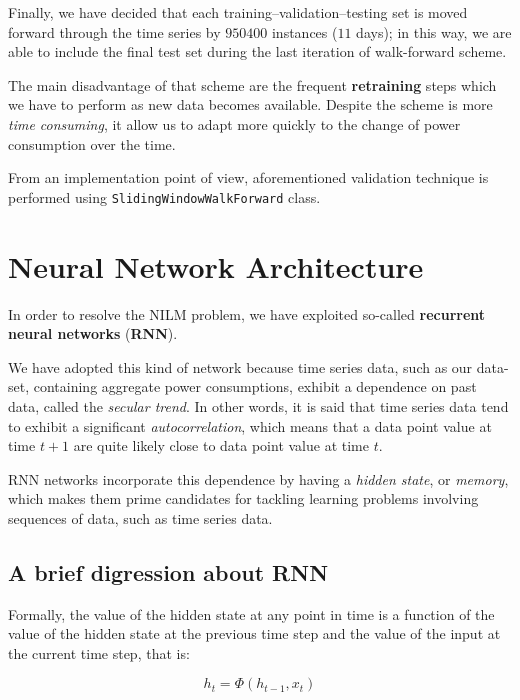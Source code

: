 \documentclass[sigconf]{acmart}
\begin{document}
Finally, we have decided that each training–validation–testing set is moved forward through the time series by $950400$ instances ($11$ days); in this way, we are able to include the final test set during the last iteration of walk-forward scheme.

The main disadvantage of that scheme are the frequent \textbf{retraining} steps which we have to perform as new data becomes available. Despite the scheme is more \textit{time consuming}, it allow us to adapt more quickly to the change of power consumption over the time\cite{WALK1}\cite{WALK2}.

From an implementation point of view, aforementioned validation technique is performed using \texttt{Sliding\-Window\-Walk\-Forward} class.

\section{Neural Network Architecture}

In order to resolve the NILM problem, we have exploited so-called \textbf{recurrent neural networks} (\textbf{RNN}).

We have adopted this kind of network because time series data, such as our data-set, containing aggregate power consumptions, exhibit a dependence on past data, called the \textit{secular trend}\cite{DeepKeras}. In other words, it is said that time series data tend to exhibit a significant \textit{autocorrelation}, which means that a data point value at time $t+1$ are quite likely close to data point value at time $t$.  

RNN networks incorporate this dependence by having a \textit{hidden state}, or \textit{memory}, which makes them prime candidates for tackling learning problems involving sequences of data, such as time series data\cite{DeepKeras}\cite{FalessiDataMining}.

\subsection{A brief digression about RNN}

Formally, the value of the hidden state at any point in time is a function of the value of the hidden state at the previous time step and the value of the input at the current time step, that is:

\begin{equation}
h_t = \Phi(h_{t-1},x_t)
\end{equation}
\end{document}
